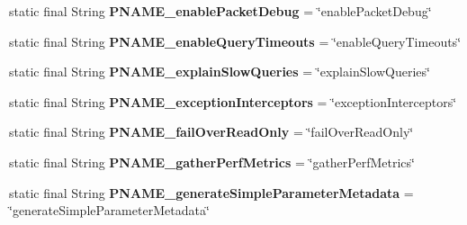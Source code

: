 \begin{DoxyCompactItemize}
static final String {\bfseries P\+N\+A\+M\+E\+\_\+enable\+Packet\+Debug} = \char`\"{}enable\+Packet\+Debug\char`\"{}
\item 
\mbox{\label{classcom_1_1mysql_1_1cj_1_1conf_1_1_property_definitions_a3d5d4f25f4470a5c87e6b71f66eafe41}} 
static final String {\bfseries P\+N\+A\+M\+E\+\_\+enable\+Query\+Timeouts} = \char`\"{}enable\+Query\+Timeouts\char`\"{}
\item 
\mbox{\label{classcom_1_1mysql_1_1cj_1_1conf_1_1_property_definitions_a5fd4030a62e52b3fd004776285005461}} 
static final String {\bfseries P\+N\+A\+M\+E\+\_\+explain\+Slow\+Queries} = \char`\"{}explain\+Slow\+Queries\char`\"{}
\item 
\mbox{\label{classcom_1_1mysql_1_1cj_1_1conf_1_1_property_definitions_ad1c96903e78b9e4773c0639a1014fa02}} 
static final String {\bfseries P\+N\+A\+M\+E\+\_\+exception\+Interceptors} = \char`\"{}exception\+Interceptors\char`\"{}
\item 
\mbox{\label{classcom_1_1mysql_1_1cj_1_1conf_1_1_property_definitions_a872c34a5c87af41a012c02851d96e004}} 
static final String {\bfseries P\+N\+A\+M\+E\+\_\+fail\+Over\+Read\+Only} = \char`\"{}fail\+Over\+Read\+Only\char`\"{}
\item 
\mbox{\label{classcom_1_1mysql_1_1cj_1_1conf_1_1_property_definitions_a8232725f9f43b860f4894e49367ec28d}} 
static final String {\bfseries P\+N\+A\+M\+E\+\_\+gather\+Perf\+Metrics} = \char`\"{}gather\+Perf\+Metrics\char`\"{}
\item 
\mbox{\label{classcom_1_1mysql_1_1cj_1_1conf_1_1_property_definitions_a0d0d98c71d9b07610fa02e4402faa552}} 
static final String {\bfseries P\+N\+A\+M\+E\+\_\+generate\+Simple\+Parameter\+Metadata} = \char`\"{}generate\+Simple\+Parameter\+Metadata\char`\"{}
\item 
\mbox{\label{classcom_1_1mysql_1_1cj_1_1conf_1_1_property_definitions_a708866004b5f2b00b1ccb882d1f89d57}} 

\end{DoxyCompactItemize}

